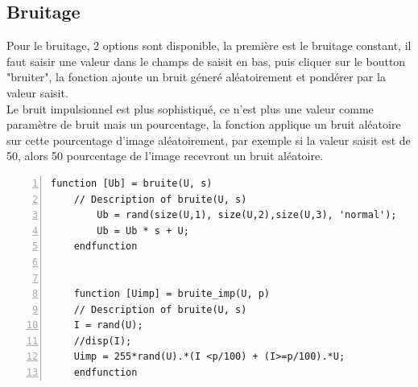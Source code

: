 \documentclass[12pt, letterpaper]{article}
\begin{document}
\subsection{Bruitage}
Pour le bruitage, 2 options sont disponible, la première est le bruitage constant, il faut saisir une valeur dans le champs de saisit en bas, 
puis cliquer sur le boutton "bruiter", la fonction ajoute un bruit géneré aléatoirement et pondérer par la valeur saisit.\\
Le bruit impulsionnel est plus sophistiqué, ce n'est plus une valeur comme paramètre de bruit mais un pourcentage, la fonction 
applique un bruit aléatoire sur cette pourcentage d'image aléatoirement, par exemple si la valeur saisit est de 50, 
alors 50 pourcentage de l'image recevront un bruit aléatoire.
\begin{Verbatim}[numbers=left,xleftmargin = 5mm]
    function [Ub] = bruite(U, s)
    // Description of bruite(U, s)
        Ub = rand(size(U,1), size(U,2),size(U,3), 'normal');
        Ub = Ub * s + U;
    endfunction
    
    
    function [Uimp] = bruite_imp(U, p)
    // Description of bruite(U, s)
    I = rand(U);
    //disp(I);
    Uimp = 255*rand(U).*(I <p/100) + (I>=p/100).*U;
    endfunction    
\end{Verbatim}
\end{document}
